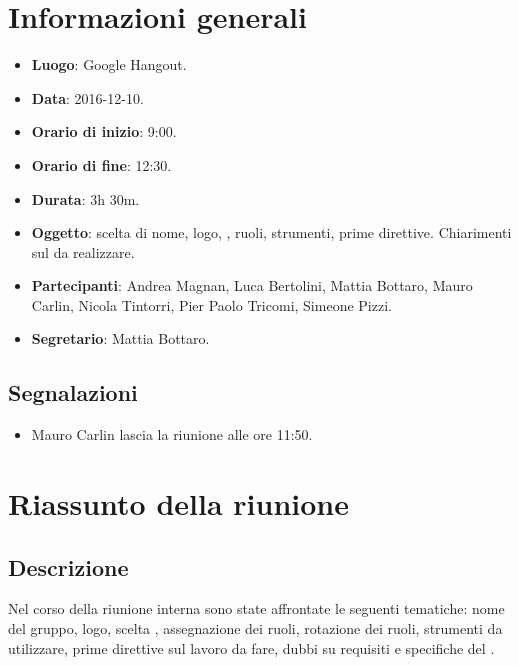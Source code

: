 \documentclass[a4paper,titlepage]{article}
\begin{document}
\maketitle
\begin{diario}
\end{diario}
\newpage
\tableofcontents

\newpage
\section{Informazioni generali}
\label{sec:Informazioni}

\begin{itemize}
  \item \textbf{Luogo}: Google Hangout.
  \item \textbf{Data}: 2016-12-10.
  \item \textbf{Orario di inizio}: 9:00.
  \item \textbf{Orario di fine}: 12:30.
  \item \textbf{Durata}: 3h 30m.
  \item \textbf{Oggetto}: scelta di nome, logo, , ruoli, strumenti, prime direttive. Chiarimenti sul  da realizzare. 
  \item \textbf{Partecipanti}: Andrea Magnan, Luca Bertolini, Mattia Bottaro, Mauro Carlin, Nicola Tintorri, Pier Paolo Tricomi, Simeone Pizzi.
  \item \textbf{Segretario}: Mattia Bottaro.
  
\end{itemize}
\subsection{Segnalazioni}
\begin{itemize}
 \item Mauro Carlin lascia la riunione alle ore 11:50.
\end{itemize}
\section{Riassunto della riunione}
\label{sec:RiassuntoRiunione}
 \subsection{Descrizione}
 Nel corso della riunione interna sono state affrontate le seguenti tematiche: nome del gruppo, logo, scelta , assegnazione dei ruoli, rotazione dei ruoli, strumenti da utilizzare, prime direttive sul lavoro da fare, dubbi su requisiti e specifiche del .
\end{document}
